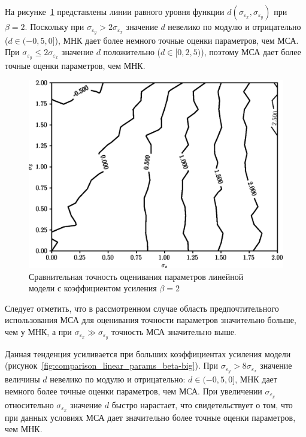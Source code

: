 \pagebreak
На рисунке~\ref{fig:comparison_linear_params_beta-2}
представлены линии равного уровня функции \( d(\sigma_{\varepsilon_x}, \sigma_{\varepsilon_y}) \)
при \( \beta = 2 \).
Поскольку при \( \sigma_{\varepsilon_y} > 2 \sigma_{\varepsilon_x} \)
значение \( d \) невелико по модулю и отрицательно (\( d \in ( -0{,}5, 0 ] \)),
МНК дает более немного точные оценки параметров, чем МСА.
При \( \sigma_{\varepsilon_y} \le 2\sigma_{\varepsilon_x} \)
значение \( d \) положительно (\( d \in [0, 2{,}5 ) \)),
поэтому МСА дает более точные оценки параметров, чем МНК.

\begin{figure}[h]
  \centering
  \includegraphics[width=135mm]{fig/linear/param/beta-2_param.png}
  \caption{%
    Сравнительная точность оценивания параметров линейной \\
    модели с коэффициентом усиления \( \beta = 2 \)
  }\label{fig:comparison_linear_params_beta-2}
\end{figure}

Следует отметить, что в рассмотренном случае область предпочтительного использования
МСА для оценивания точности параметров значительно больше, чем у МНК,
а при \( \sigma_{\varepsilon_x} \gg \sigma_{\varepsilon_y} \) точность МСА значительно выше.

Данная тенденция усиливается при больших коэффициентах усиления модели
(рисунок~\ref{fig:comparison_linear_params_beta-big}).
При \( \sigma_{\varepsilon_y} > 8\sigma_{\varepsilon_x} \)
значение величины \( d \) невелико по модулю и отрицательно: \( d \in ( -0{,}5, 0 ] \),
МНК дает немного более точные оценки параметров, чем МСА.
При увеличении \( \sigma_{\varepsilon_y} \) относительно \( \sigma_{\varepsilon_x} \) значение
\( d \) быстро нарастает, что свидетельствует о том,
что при данных условиях МСА дает значительно более точные оценки параметров, чем МНК.

